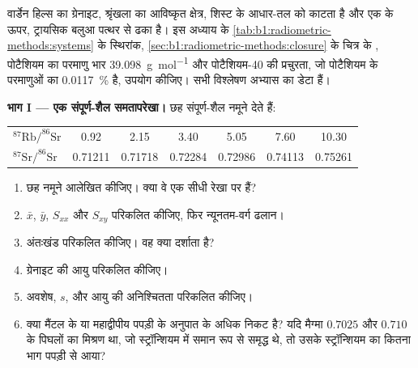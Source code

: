\begin{problem}
\label{pb:b1:radiometric-methods:1}
वार्डेन हिल्स का ग्रेनाइट, श्रृंखला का आविष्कृत क्षेत्र, शिस्ट के आधार-तल को काटता है और एक  के ऊपर, ट्रायसिक बलुआ पत्थर से ढका है। इस अध्याय के \cref{tab:b1:radiometric-methods:systems} के स्थिरांक, \cref{sec:b1:radiometric-methods:closure} के चित्र के , पोटैशियम का परमाणु भार \qty{39.098}{g.mol^{-1}} और पोटैशियम-40 की प्रचुरता, जो पोटैशियम के परमाणुओं का \qty{0.0117}{\percent} है, उपयोग कीजिए। सभी विश्लेषण अभ्यास का डेटा हैं।

\medskip
\noindent\textbf{भाग I --- एक संपूर्ण-शैल समतापरेखा।} छह संपूर्ण-शैल नमूने देते हैं:
\begin{center}
\small
\begin{tabular}{|l|cccccc|}
\hline
$^{87}\mathrm{Rb}/^{86}\mathrm{Sr}$ & 0.92 & 2.15 & 3.40 & 5.05 & 7.60 & 10.30 \\
$^{87}\mathrm{Sr}/^{86}\mathrm{Sr}$ & 0.71211 & 0.71718 & 0.72284 & 0.72986 & 0.74113 & 0.75261 \\
\hline
\end{tabular}
\end{center}
\begin{enumerate}
  \item छह नमूने आलेखित कीजिए। क्या वे एक सीधी रेखा पर हैं?
  \item $\bar x$, $\bar y$, $S_{xx}$ और $S_{xy}$ परिकलित कीजिए, फिर न्यूनतम-वर्ग ढलान।
  \item अंतःखंड परिकलित कीजिए। वह क्या दर्शाता है?
  \item ग्रेनाइट की आयु परिकलित कीजिए।
  \item अवशेष, $s$, और आयु की अनिश्चितता परिकलित कीजिए।
  \item क्या  मैंटल के या महाद्वीपीय पपड़ी के अनुपात के अधिक निकट है? यदि मैग्मा $0.7025$ और $0.710$ के पिघलों का मिश्रण था, जो स्ट्रॉन्शियम में समान रूप से समृद्ध थे, तो उसके स्ट्रॉन्शियम का कितना भाग पपड़ी से आया?
\end{enumerate}


\end{problem}
